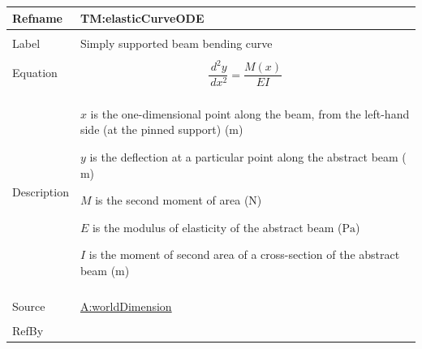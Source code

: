 \documentclass[12pt]{article}
\begin{document}
\begin{minipage}{\textwidth}
\begin{tabular}{>{\raggedright}p{}>{\raggedright\arraybackslash}p{}}
\toprule \textbf{Refname} & \textbf{TM:elasticCurveODE}
\label{TM:elasticCurveODE}
\\ \midrule \\
Label & Simply supported beam bending curve
        
\\ \midrule \\
Equation & \begin{displaymath}
           \frac{\,d^{2}y}{\,dx^{2}}=\frac{M\left(x\right)}{E I}
           \end{displaymath}
\\ \midrule \\
Description & \begin{symbDescription}
              \item{$x$ is the one-dimensional point along the beam, from the left-hand side (at the pinned support) (${\text{m}}$)}
              \item{$y$ is the deflection at a particular point along the abstract beam (${\text{m}}$)}
              \item{$M$ is the second moment of area (${\text{N}}$)}
              \item{$E$ is the modulus of elasticity of the abstract beam (${\text{Pa}}$)}
              \item{$I$ is the moment of second area of a cross-section of the abstract beam (${\text{m}}$)}
              \end{symbDescription}
\\ \midrule \\
Source & \hyperref[worldDimension]{A:worldDimension}
         
\\ \midrule \\
RefBy & 
\\ \bottomrule
\end{tabular}
\end{minipage}
\vspace{\baselineskip}
\noindent
\end{document}
